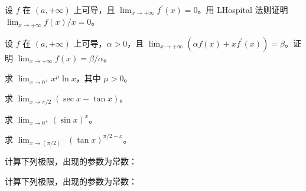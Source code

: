 \noindent\begin{minipage}{\textwidth}
设 $f$ 在 $(a,+\infty)$ 上可导，且 $\lim_{x\to+\infty}f^{\prime}(x)=0$。用 L\textquotesingle Hospital 法则证明 $\lim_{x\to+\infty}f(x)/x=0$。
\end{minipage}\par\vfill
\noindent\begin{minipage}{\textwidth}
设 $f$ 在 $(a,+\infty)$ 上可导，$\alpha>0$，且 $\lim_{x\to+\infty}(\alpha f(x)+xf^{\prime}(x))=\beta$。证明 $\lim_{x\to+\infty}f(x)=\beta/\alpha$。
\end{minipage}\par\vfill
\newpage
\noindent\begin{minipage}{\textwidth}
求 $\lim_{x\to0^+}x^\mu\ln x$，其中 $\mu>0$。
\end{minipage}\par\vfill
\noindent\begin{minipage}{\textwidth}
求 $\lim_{x\to\pi/2}(\sec x-\tan x)$。
\end{minipage}\par\vfill
\noindent\begin{minipage}{\textwidth}
求 $\lim_{x\to0^+}(\sin x)^x$。
\end{minipage}\par\vfill
\newpage
\noindent\begin{minipage}{\textwidth}
求 $\lim_{x\to(\pi/2)^-}(\tan x)^{\pi/2-x}$。
\end{minipage}\par\vfill
\noindent\begin{minipage}{\textwidth}
计算下列极限，出现的参数为常数：
\end{minipage}\par\vfill
\noindent\begin{minipage}{\textwidth}
计算下列极限，出现的参数为常数：
\end{minipage}\par\vfill
